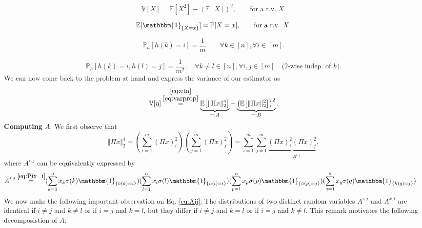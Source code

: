 \documentclass[10pt,usenames,dvipsnames]{article}
\newcommand{\Pbb}{\mathbb{P}}
\newcommand{\Ebb}{\mathbb{E}}
\newcommand{\Vbb}{\mathbb{V}}
\newcommand{\ind}{\mathbbm{1}} %
\newenvironment{exercise}[2][Exercise]{\begin{trivlist}
  \item[\hskip \labelsep {\bfseries #1}\hskip \labelsep {\bfseries #2.}]}{\end{trivlist}}
\begin{document}
\begin{exercise}{2b}
		\begin{equation}
		\label{eq:varprop}
		\Vbb[X] = \Ebb[X^2]-\left( \Ebb[X]\right)^2, \qquad \mbox{for a r.v. $X$.}
		\end{equation}

		\begin{equation}
		\label{eq:indprop}
		\Ebb[\ind_{\{X=x\}}] =\Pbb[X=x] , \qquad \mbox{for a r.v. $X$.}
		\end{equation}			
		
		\begin{equation}
		\label{eq:h_prop}
		\Pbb_{h}[h(k) = i] = \frac{1}{m}  \qquad  \forall k \in [n], \forall i \in [m].
		\end{equation}		
		
		\begin{equation}
		\label{eq:h_2wise}
		\Pbb_{h}[h(k) = i, h(l) = j] = \frac{1}{m^2}, \quad  \forall k \neq l \in [n] , \forall i, j \in [m]\quad \mbox{($2$-wise indep. of $h$).}
		\end{equation}		
		We can now come back to the problem at hand and express the variance of our estimator as 
		\begin{equation}
		\label{eq:eta_variance}
		\Vbb[\eta] \overset{ \substack{ \eqref{eq:eta} \\ \eqref{eq:varprop}}}{=} 
			\underbrace{\Ebb\big[\Vert \Pi x \Vert_2^4\big]}_{=:A} - \underbrace{\left(\Ebb\big[\Vert \Pi x \Vert_2^2\big]\right)^2}_{=:B}.
		\end{equation}
		\newline \textbf{Computing $A$}: We first observe that
		$$
		\Vert \Pi x \Vert_2^4
		= \left(\sum_{i=1}^{m} \left(\Pi x \right)_i^2 \right)  \left(\sum_{j=1}^{m} \left(\Pi x \right)_j^2 \right)
		= \sum_{i=1}^{m} \sum_{j=1}^m \underbrace{\left(\Pi x \right)_i^2\left(\Pi x \right)_j^2}_{=:A^{i,j}},
		$$
		where $A^{i,j}$ can be equivalently expressed by
		\small
		\begin{align}
		\label{eq:Aij}
		A^{i,j} \overset{\eqref{eq:Pix_i}}{=} 	&
									( \sum_{k=1}^n x_k \sigma(k) \ind_{\{ h(k) = i \}} )
									( \sum_{l=1}^n x_l \sigma(l) \ind_{\{ h(l) = i \}} )
									( \sum_{p=1}^n x_p \sigma(p) \ind_{\{ h(p) = j \}} )
									( \sum_{q=1}^n x_q \sigma(q) \ind_{\{ h(q) = j \}} )
		\end{align}
		\normalsize	
		 We now make the following important observation on Eq. \eqref{eq:Aij}: The distributions of two distinct random variables $A^{i,j}$ and $A^{k,l}$ are identical if $i\neq j$ and $k \neq l$ or if $i = j$ and $k = l$, but they differ if $i\neq j$ and $k = l$ or if $i = j$ and $k \neq l$. This remark motivates the following decomposistion of $A$:

\end{exercise}
\end{document}
